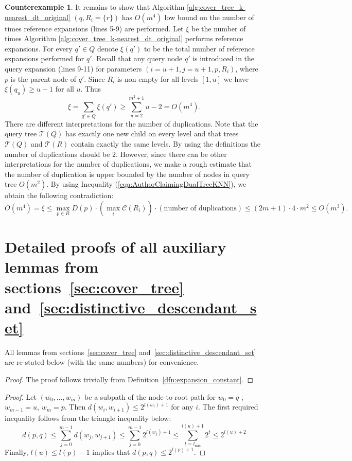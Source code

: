 \documentclass[a4paper,UKenglish,cleveref, autoref]{lipics-v2019}
\numberwithin{algocf}{section}
\theoremstyle{definition}
\theoremstyle{definition}
\theoremstyle{definition}
\newtheorem{cexa}[algocf]{Counterexample}
\theoremstyle{plain}
\newcommand{\C}{\mathcal{C}}
\newcommand{\T}{\mathcal{T}}
\begin{document}
\begin{cexa}
It remains to show that Algorithm \ref{alg:cover_tree_k-nearest_dt_original} $(q, R_i = \{r\})$ has $O(m^4)$ low bound on the number of times reference expansions (lines 5-9) are performed.
Let $\xi$ be the number of times Algorithm \ref{alg:cover_tree_k-nearest_dt_original} performs 
reference expansions.  For every $q' \in Q$ denote $\xi(q')$ to be the total number of reference expansions performed for $q'$. Recall that any query node $q'$ is introduced in the query expansion (lines 9-11) for parameters $(i = u+1, j = u+1, p, R_i)$, where $p$ is the parent node of $q'$. Since $R_i$ is non empty for all levels $[1,u]$ we have $\xi(q_u) \geq u - 1$ for all $u$. Thus 
$$\xi = \sum_{q' \in Q} \xi(q') \geq \sum^{m^2+1}_{u = 2} u-2 = O(m^4).$$
There are different interpretations for the number of duplications. Note that the query tree $\T(Q)$ has exactly one new child on every level and that trees $\T(Q)$ and $\T(R)$ contain exactly the same levels. By using the definitions the number of duplications should be $2$. However, since there can be other interpretations for the number of duplications, we make a rough estimate that the number of duplication is upper bounded by the number of nodes in query tree $O(m^2)$. By using Inequality (\ref{eqa:AuthorClaimingDualTreeKNN}), we obtain the following contradiction: 
$$O(m^4) = \xi \leq  \max_{p \in R}D(p) \cdot (\max_i \C(R_i)) \cdot (\text{number of duplications}) \leq (2m+1) \cdot 4 \cdot m^2 \leq O(m^3).$$
\end{cexa}

\section{Detailed proofs of all auxiliary lemmas from sections~\ref{sec:cover_tree} and~\ref{sec:distinctive_descendant_set}}
\label{sec:proofs}

All lemmas from sections~\ref{sec:cover_tree} and~\ref{sec:distinctive_descendant_set} are re-stated below (with the same numbers) for convenience.
 
\lemexpansionconstantproperty*
\begin{proof}
The proof follows trivially from Definition~\ref{dfn:expansion_constant}.
\end{proof}

\lemcompressedcovertreedescendantbound*
\begin{proof}
Let $(w_0, ..., w_m)$ be a subpath of the node-to-root path for $w_0 = q$ , $w_{m-1} = u$, $w_m = p$. 
Then $d(w_{i}, w_{i+1}) \leq 2^{l(w_i) + 1}$ for any $i$. 
The first required inequality follows from the triangle inequality below: 
$$    d(p,q) \leq \sum^{m-1}_{j = 0}d(w_j, w_{j+1})  \leq \sum^{m-1}_{j = 0}2^{l(w_j) + 1} \leq   \sum_{t = l_{\min}}^{l(u) + 1}2^{t}\leq  2^{l(u) + 2} $$
Finally, $l(u) \leq l(p) - 1$ implies that $d(p,q) \leq 2^{l(p)+1}$.
\end{proof}
\end{document}
